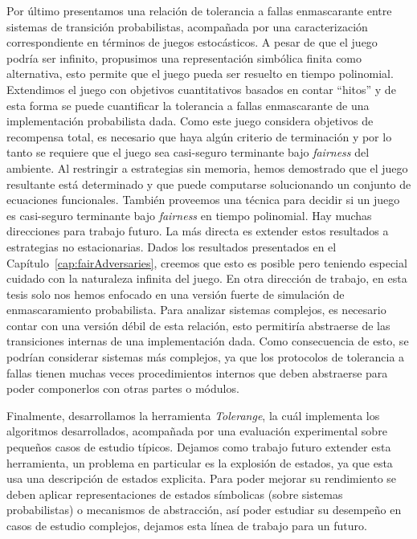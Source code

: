 Por último presentamos una relación de tolerancia a fallas enmascarante entre sistemas de transición probabilistas, acompañada por una caracterización correspondiente en términos de juegos estocásticos. A pesar de que el juego podría ser infinito, propusimos una representación simbólica finita como alternativa, esto permite que el juego pueda ser resuelto en tiempo polinomial.
%
Extendimos el juego con objetivos cuantitativos basados en contar ``hitos'' y de esta forma se puede cuantificar la tolerancia a fallas enmascarante de una implementación probabilista dada.
%
Como este juego considera objetivos de recompensa total, es necesario que haya algún criterio de terminación y por lo tanto se requiere que el juego sea casi-seguro terminante bajo \textit{fairness} del ambiente.
%
Al restringir a estrategias sin memoria, hemos demostrado que el juego resultante está determinado y que puede computarse solucionando un conjunto de ecuaciones funcionales. También proveemos una técnica para decidir si un juego es casi-seguro terminante bajo \textit{fairness} en tiempo polinomial.
%
Hay muchas direcciones para trabajo futuro. La más directa es extender estos resultados a estrategias no estacionarias. Dados los resultados presentados en el Capítulo~\ref{cap:fairAdversaries}, creemos que esto es posible pero teniendo especial cuidado con la naturaleza infinita del juego.
%
En otra dirección de trabajo, en esta tesis solo nos hemos enfocado en una versión fuerte de simulación de enmascaramiento probabilista. Para analizar sistemas complejos, es necesario contar con una versión débil de esta relación, esto permitiría abstraerse de las transiciones internas de una implementación dada. Como consecuencia de esto, se podrían considerar sistemas más complejos, ya que los protocolos de tolerancia a fallas tienen muchas veces procedimientos internos que deben abstraerse para poder componerlos con otras partes o módulos.
%

%
Finalmente, desarrollamos la herramienta \emph{Tolerange}, la cuál implementa los algoritmos desarrollados, acompañada por una evaluación experimental sobre pequeños casos de estudio típicos. Dejamos como trabajo futuro extender esta herramienta, un problema en particular es la explosión de estados, ya que esta usa una descripción de estados explicita. Para poder mejorar su rendimiento se deben aplicar representaciones de estados símbolicas (sobre sistemas probabilistas) o mecanismos de abstracción, así poder estudiar su desempeño en casos de estudio complejos, dejamos esta línea de trabajo para un futuro.
